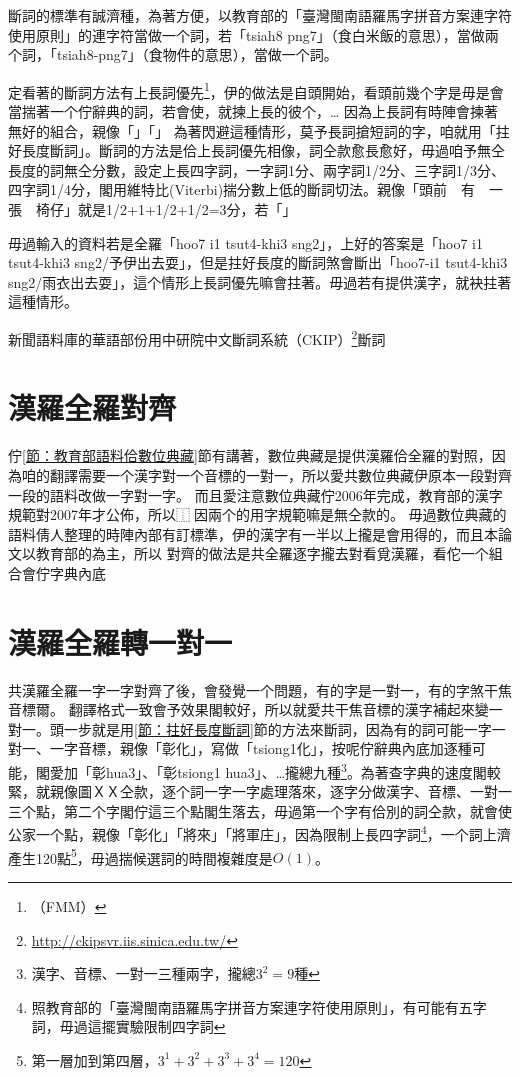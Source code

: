 \documentclass[final,oneside,onecolumn,12pt,a4paper]{book}%
\begin{document}
斷詞的標準有誠濟種，為著方便，以教育部的「臺灣閩南語羅馬字拼音方案連字符使用原則」的連字符當做一个詞，若「tsiah8 png7」（食白米飯的意思），當做兩个詞，「tsiah8-png7」（食物件的意思），當做一个詞。

定看著的斷詞方法有上長詞優先\footnote{（FMM）}，伊的做法是自頭開始，看頭前幾个字是毋是會當揣著一个佇辭典的詞，若會使，就揀上長的彼个，…%
因為上長詞有時陣會揀著無好的組合，親像「」「」
為著閃避這種情形，莫予長詞搶短詞的字，咱就用「拄好長度斷詞」。斷詞的方法是佮上長詞優先相像，詞仝款愈長愈好，毋過咱予無仝長度的詞無仝分數，設定上長四字詞，一字詞1分、兩字詞1/2分、三字詞1/3分、四字詞1/4分，閣用維特比(Viterbi)揣分數上低的斷詞切法。親像「頭前　有　一張　椅仔」就是1/2+1+1/2+1/2=3分，若「」%

毋過輸入的資料若是全羅「hoo7 i1 tsut4-khi3 sng2」，上好的答案是「hoo7 i1 tsut4-khi3 sng2/予伊出去耍」，但是拄好長度的斷詞煞會斷出「hoo7-i1 tsut4-khi3 sng2/雨衣出去耍」，這个情形上長詞優先嘛會拄著。毋過若有提供漢字，就袂拄著這種情形。

新聞語料庫的華語部份用中研院中文斷詞系統（CKIP）\footnote{\url{http://ckipsvr.iis.sinica.edu.tw/}}斷詞

\section{漢羅全羅對齊}
\label{節：漢羅全羅對齊}
佇\ref{節：教育部語料佮數位典藏}節有講著，數位典藏是提供漢羅佮全羅的對照，因為咱的翻譯需要一个漢字對一个音標的一對一，所以愛共數位典藏伊原本一段對齊一段的語料改做一字對一字。
而且愛注意數位典藏佇2006年完成，教育部的漢字規範對2007年才公佈，所以⿰因兩个的用字規範嘛是無仝款的。
毋過數位典藏的語料倩人整理的時陣內部有訂標準，伊的漢字有一半以上攏是會用得的，而且本論文以教育部的為主，所以
對齊的做法是共全羅逐字攏去對看覓漢羅，看佗一个組合會佇字典內底




\section{漢羅全羅轉一對一}
\label{節：漢羅全羅轉一對一}
共漢羅全羅一字一字對齊了後，會發覺一个問題，有的字是一對一，有的字煞干焦音標爾。
翻譯格式一致會予效果閣較好，所以就愛共干焦音標的漢字補起來變一對一。頭一步就是用\ref{節：拄好長度斷詞}節的方法來斷詞，因為有的詞可能一字一對一、一字音標，親像「彰化」，寫做「tsiong1化」，按呢佇辭典內底加逐種可能，閣愛加「彰hua3」、「彰tsiong1 hua3」、…攏總九種\footnote{漢字、音標、一對一三種兩字，攏總$3^{2}=9$種}。為著查字典的速度閣較緊，就親像圖ＸＸ仝款，逐个詞一字一字處理落來，逐字分做漢字、音標、一對一三个點，第二个字閣佇這三个點閣生落去，毋過第一个字有佮別的詞仝款，就會使公家一个點，親像「彰化」「將來」「將軍庄」，因為限制上長四字詞\footnote{照教育部的「臺灣閩南語羅馬字拼音方案連字符使用原則」，有可能有五字詞，毋過這擺實驗限制四字詞}，一个詞上濟產生120點\footnote{第一層加到第四層，$3^{1}+3^{2}+3^{3}+3^{4}=120$}，毋過揣候選詞的時間複雜度是$O(1)$。
\end{document}
